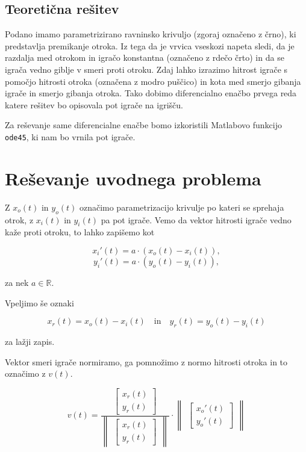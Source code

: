 \documentclass[mat1,reqno]{fmfdelo}
\begin{document}
\subsection{Teoretična rešitev}

Podano imamo parametrizirano ravninsko krivuljo (zgoraj označeno z črno), ki predstavlja premikanje otroka. Iz tega da je vrvica vseskozi napeta sledi, da je razdalja med otrokom in igračo konstantna (označeno z rdečo črto) in da se igrača vedno giblje v smeri proti otroku. Zdaj lahko izrazimo hitrost igrače s pomočjo hitrosti otroka (označena z modro puščico) in kota med smerjo gibanja igrače in smerjo gibanja otroka. Tako dobimo diferencialno enačbo prvega reda katere rešitev bo opisovala pot igrače na igrišču.

Za reševanje same diferencialne enačbe bomo izkoristili Matlabovo funkcijo {\texttt{ode45}}, ki nam bo vrnila pot igrače.


\section{Reševanje uvodnega problema}

Z $x_{o}(t)$ in $y_{o}(t)$ označimo parametrizacijo krivulje po kateri se sprehaja otrok, z $x_{i}(t)$ in $y_{i}(t)$ pa pot igrače. Vemo da vektor hitrosti igrače vedno kaže proti otroku, to lahko zapišemo kot

$$x_{i}'(t) = a \cdot (x_{o}(t) - x_{i}(t)),$$
$$y_{i}'(t) = a \cdot (y_{o}(t) - y_{i}(t)),$$

za nek $a \in \mathbb R$.

Vpeljimo še oznaki

\begin{equation*}
x_{r}(t) = x_{o}(t) - x_{i}(t) \quad \textrm{in} \quad
y_{r}(t) = y_{o}(t) - y_{i}(t)
\end{equation*}

za lažji zapis.

Vektor smeri igrače normiramo, ga pomnožimo z normo hitrosti otroka in to označimo z $v(t)$.

\begin{equation}\label{enačba:v}
v(t) = \frac{
\begin{bmatrix}
	x_{r}(t) \\
	y_{r}(t)
\end{bmatrix}
}
{
\begin{Vmatrix}
\begin{bmatrix}
	x_{r}(t) \\
	y_{r}(t)
\end{bmatrix}
\end{Vmatrix}
}
\cdot
\begin{Vmatrix}
\begin{bmatrix}
	x_{o}'(t) \\
	y_{o}'(t)
\end{bmatrix}
\end{Vmatrix}
\end{equation}
\\
\end{document}
